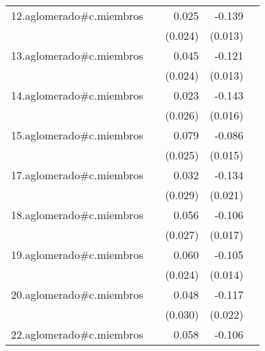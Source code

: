 {\begin{longtable}{l*{4}{D{.}{.}{-1}}}
\addlinespace
12.aglomerado#c.miembros&                     &       0.025         &      -0.139\sym{***}&                     \\
            &                     &     (0.024)         &     (0.013)         &                     \\
\addlinespace
13.aglomerado#c.miembros&                     &       0.045         &      -0.121\sym{***}&                     \\
            &                     &     (0.024)         &     (0.013)         &                     \\
\addlinespace
14.aglomerado#c.miembros&                     &       0.023         &      -0.143\sym{***}&                     \\
            &                     &     (0.026)         &     (0.016)         &                     \\
\addlinespace
15.aglomerado#c.miembros&                     &       0.079\sym{**} &      -0.086\sym{***}&                     \\
            &                     &     (0.025)         &     (0.015)         &                     \\
\addlinespace
17.aglomerado#c.miembros&                     &       0.032         &      -0.134\sym{***}&                     \\
            &                     &     (0.029)         &     (0.021)         &                     \\
\addlinespace
18.aglomerado#c.miembros&                     &       0.056\sym{*}  &      -0.106\sym{***}&                     \\
            &                     &     (0.027)         &     (0.017)         &                     \\
\addlinespace
19.aglomerado#c.miembros&                     &       0.060\sym{*}  &      -0.105\sym{***}&                     \\
            &                     &     (0.024)         &     (0.014)         &                     \\
\addlinespace
20.aglomerado#c.miembros&                     &       0.048         &      -0.117\sym{***}&                     \\
            &                     &     (0.030)         &     (0.022)         &                     \\
\addlinespace
22.aglomerado#c.miembros&                     &       0.058\sym{*}  &      -0.106\sym{***}&                     \\

\end{longtable}}
